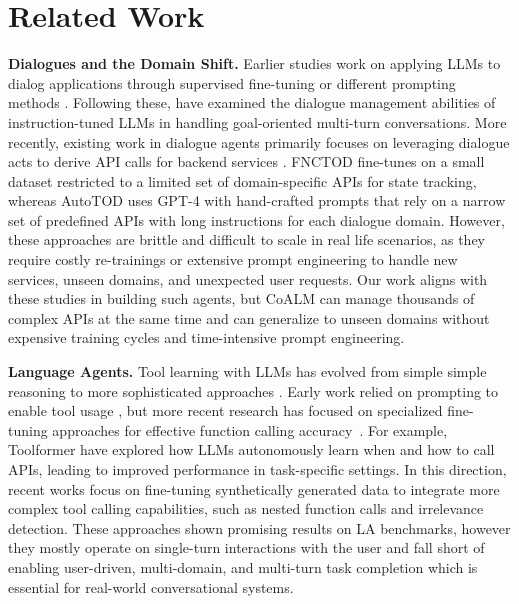 \section{Related Work}

\noindent\textbf{Dialogues and the Domain Shift.} Earlier studies work on applying LLMs to dialog applications through supervised fine-tuning \cite{su-etal-2022-multi, gupta-etal-2022-instructdial} or different prompting methods \cite{hu-etal-2022-context, chung-etal-2023-instructtods, zhang-etal-2023-sgp}.
Following these, \citet{hudecek-dusek-2023-large} have examined the dialogue management abilities of instruction-tuned LLMs in handling goal-oriented multi-turn conversations.
More recently, existing work in dialogue agents primarily focuses on leveraging dialogue acts to derive API calls for backend services \cite{li2024largelanguagemodelszeroshot, xu-etal-2024-rethinking, king-flanigan-2024-unsupervised}.
FNCTOD \cite{li2024largelanguagemodelszeroshot} fine-tunes on a small dataset restricted to a limited set of domain-specific APIs for state tracking, whereas AutoTOD \cite{xu-etal-2024-rethinking} uses GPT-4 with hand-crafted prompts that rely on a narrow set of predefined APIs with long instructions for each dialogue domain. However, these approaches are brittle and difficult to scale in real life scenarios, as they require costly re-trainings or extensive prompt engineering to handle new services, unseen domains, and unexpected user requests. Our work aligns with these studies in building such agents, but CoALM can manage thousands of complex APIs at the same time and can generalize to unseen domains without expensive training cycles and time-intensive prompt engineering. %

\vspace{3mm}

\noindent\textbf{Language Agents.} Tool learning with LLMs has evolved from simple simple reasoning \cite{NEURIPS2022_9d560961-cot} to more sophisticated approaches \cite{yao2023reactsynergizingreasoningacting-react, tool_learning}. Early work relied on prompting to enable tool usage \cite{yao2023reactsynergizingreasoningacting-react, paranjape2023art}, but more recent research has focused on specialized fine-tuning approaches for effective function calling accuracy~\cite{schick2024toolformer, patil2023gorilla, wang2024executable, zhang2024xlam}. For example, Toolformer \cite{schick2024toolformer} have explored how LLMs autonomously learn when and how to call APIs, leading to improved performance in task-specific settings. In this direction, recent works \cite{abdelaziz-etal-2024-granite, Liu2024ToolACE, Lin2024Hammer} focus on fine-tuning synthetically generated data to integrate more complex tool calling capabilities, such as nested function calls and irrelevance detection. These approaches shown promising results on LA benchmarks, however they mostly operate on single-turn interactions with the user and fall short of enabling user-driven, multi-domain, and multi-turn task completion which is essential for real-world conversational systems.